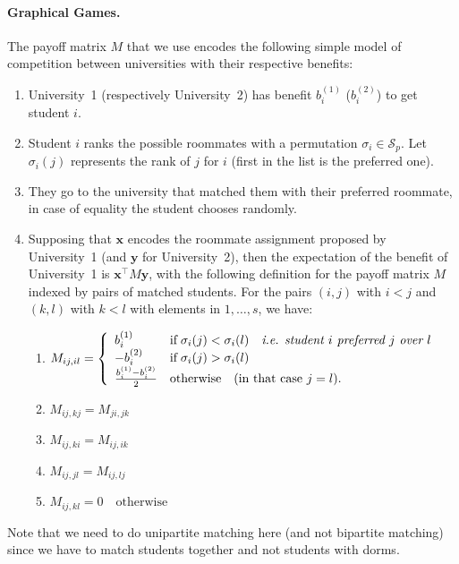\documentclass[twoside]{article}
\newcommand{\x}{\bm{x}}
\newcommand{\y}{\bm{y}}
\newcommand{\0}{\mathbf{0}} %
\begin{document}
  \paragraph{Graphical Games.} %
  \label{par:graphical_games}
  The payoff matrix $M$ that we use encodes the following simple
model of competition between universities with their respective benefits: 
\begin{enumerate}
  \item University~1 (respectively University~2) has benefit $b_i^{(1)}$ ($b_i^{(2)}$) to get student $i$. 
  \item Student $i$ ranks the possible
roommates with a permutation $\sigma_i \in \mathcal S_p$. Let $\sigma_i(j)$ represents the rank of $j$ for $i$ (first in the list is the preferred one). 
  \item They go to the university that matched them with their preferred roommate, in case of equality the student chooses randomly.
  \item Supposing that $\x$ encodes the roommate assignment proposed by University~1 (and $\y$ for University~2), then the expectation of the benefit of University~1 is $\x^\top M \y$,
with the following definition for the payoff matrix $M$ indexed by pairs
of matched students. For the pairs $(i,j)$ with $i < j$ and $(k,l)$ with $k < l$ with elements in $1, \ldots, s$, we have:
\begin{enumerate}
  \item $M_{ij,il} = \left\{ 
            \begin{array}{lll}
            b_i^{(1)} & \text{if} \; \sigma_i(j) < \sigma_i(l) \quad \text{\emph{i.e. student $i$ preferred $j$ over $l$}}\\
            -b_i^{(2)} & \text{if} \; \sigma_i(j) > \sigma_i(l) \\
            \frac{b_i^{(1)} - b_i^{(2)}}{2} & \text{otherwise}  \quad (\text{in that case }j = l).
            \end{array} \right.$
  \item $M_{ij,kj} = M_{ji,jk}$ %
  \item $M_{ij,ki} = M_{ij,ik}$
  \item $M_{ij,jl} = M_{ij,lj}$
  \item $M_{ij,kl} = 0 \quad \text{otherwise}$
\end{enumerate}
\end{enumerate}
Note that we need to do unipartite matching here (and not bipartite
matching) since we have to match students together and not students with dorms. 
\end{document}
